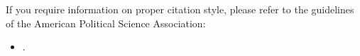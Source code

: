 \documentclass[abstract=on,parskip=full,headings=standardclasses,fontsize=11pt,paper=a4]{scrartcl}
\begin{document}
If you require information on proper citation style, please refer to the guidelines of the American Political Science Association:

\begin{itemize}
\item {}.
\end{itemize}

\end{document}
